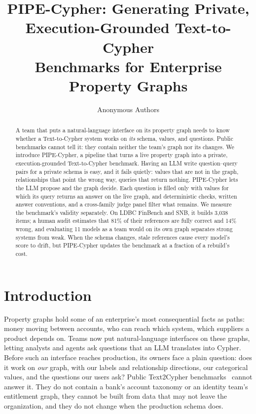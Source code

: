 \documentclass[11pt]{article}
\title{PIPE-Cypher: Generating Private, Execution-Grounded Text-to-Cypher\\Benchmarks for Enterprise Property Graphs}
\author{Anonymous Authors}
\begin{document}
\maketitle

\begin{abstract}
A team that puts a natural-language interface on its property graph needs to know whether a Text-to-Cypher system works on \emph{its} schema, values, and questions. Public benchmarks cannot tell it: they contain neither the team's graph nor its changes. We introduce PIPE-Cypher, a pipeline that turns a live property graph into a private, execution-grounded Text-to-Cypher benchmark. Having an LLM write question--query pairs for a private schema is easy, and it fails quietly: values that are not in the graph, relationships that point the wrong way, queries that return nothing. PIPE-Cypher lets the LLM propose and the graph decide. Each question is filled only with values for which its query returns an answer on the live graph, and deterministic checks, written answer conventions, and a cross-family judge panel filter what remains. We measure the benchmark's validity separately. On LDBC FinBench and SNB, it builds 3,038 items; a human audit estimates that 81\% of their references are fully correct and 14\% wrong, and evaluating 11 models as a team would on its own graph separates strong systems from weak. When the schema changes, stale references cause every model's score to drift, but PIPE-Cypher updates the benchmark at a fraction of a rebuild's cost.
\end{abstract}

\section{Introduction}
Property graphs hold some of an enterprise's most consequential facts as paths: money moving between accounts, who can reach which system, which suppliers a product depends on. Teams now put natural-language interfaces on these graphs, letting analysts and agents ask questions that an LLM translates into Cypher. Before such an interface reaches production, its owners face a plain question: does it work on \emph{our} graph, with our labels and relationship directions, our categorical values, and the questions our users ask? Public Text2Cypher benchmarks~\citep{text2cypher2025,cypherbench2025,mindthequery2025} cannot answer it. They do not contain a bank's account taxonomy or an identity team's entitlement graph, they cannot be built from data that may not leave the organization, and they do not change when the production schema does.
\end{document}
